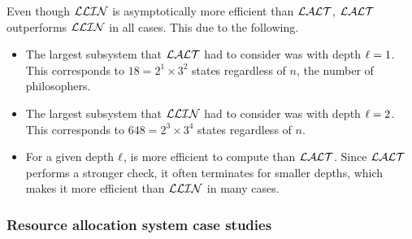 Even though $\mathcal{LLIN}$ is asymptotically more efficient than $\mathcal{LALT}$,
$\mathcal{LALT}$ outperforms $\mathcal{LLIN}$ in all cases. This due to the following. 

\begin{itemize}
\item The largest subsystem that $\mathcal{LALT}$ had to consider was with depth $\ell=1$. This corresponds to $18 = 2^1\times 3^2$ states regardless of $n$, the number of philosophers. 
\item The largest subsystem that $\mathcal{LLIN}$ had to consider was with depth $\ell=2$. This corresponds to $648 = 2^3 \times 3^4$ states regardless of $n$. 
\item For a given depth $\ell$, \LLin is more efficient to compute than $\mathcal{LALT}$. 
 Since $\mathcal{LALT}$ performs a stronger check, it often terminates for smaller depths, which makes it
 more efficient than $\mathcal{LLIN}$ in many cases.
\end{itemize}


\begin{table}
\label{bench:dining}
\end{table}



\subsubsection{Resource allocation system case studies}

